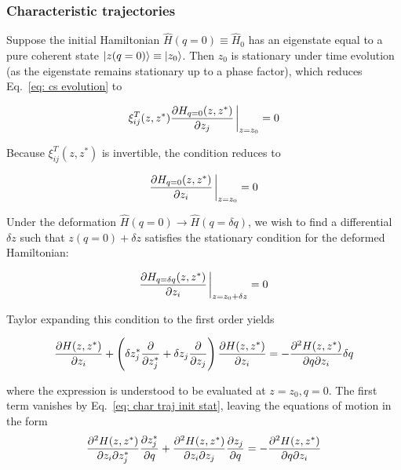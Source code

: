 \documentclass[12pt]{article}
\begin{document}
	\subsubsection{Characteristic trajectories}
	
	Suppose the initial Hamiltonian $\hat{H}(q = 0) \equiv \hat{H}_0$ has an eigenstate equal to a pure coherent state $\ket{z(q = 0)}\equiv \ket{z_0}$. Then $z_0$ is stationary under time evolution (as the eigenstate remains stationary up to a phase factor), which reduces Eq.~\eqref{eq: cs evolution} to
	
	\begin{equation}
	\xi^T_{ij}(z, z^*) \pdv{H_{q = 0}(z, z^*)}{z_j}\eval_{z = z_0} = 0
	\end{equation}
	
	Because $\xi_{ij}^T(z, z^*)$ is invertible, the condition reduces to
	
	\begin{equation} \label{eq: char traj init stat}
	\pdv{H_{q = 0}(z, z^*)}{z_i}\eval_{z = z_0} = 0
	\end{equation}
	
	Under the deformation $\hat{H}(q = 0)\to \hat{H}(q = \delta q)$, we wish to find a differential $\delta z$ such that $z(q = 0) + \delta z$ satisfies the stationary condition for the deformed Hamiltonian:
	
	\begin{equation}
	\pdv{H_{q = \delta q}(z, z^*)}{z_i}\eval_{z = z_0 + \delta z} = 0
	\end{equation}
	
	Taylor expanding this condition to the first order yields
	
	\begin{equation}
	\pdv{H(z, z^*)}{z_i} + \left(\delta z_j^* \pdv{z_j^*} + \delta z_j \pdv{z_j}\right) \pdv{H(z, z^*)}{z_i} = -\pdv[2]{H(z, z^*)}{q}{z_i}\delta q
	\end{equation}
	
	where the expression is understood to be evaluated at $z = z_0, q = 0$. The first term vanishes by Eq.~\eqref{eq: char traj init stat}, leaving the equations of motion in the form
	\begin{equation}
	\pdv[2]{H(z, z^*)}{z_i}{z_j^*} \pdv{z_j^*}{q} + \pdv[2]{H(z, z^*)}{z_i}{z_j} \pdv{z_j}{q} = -\pdv[2]{H(z, z^*)}{q}{z_i}
	\end{equation}
	
\end{document}
